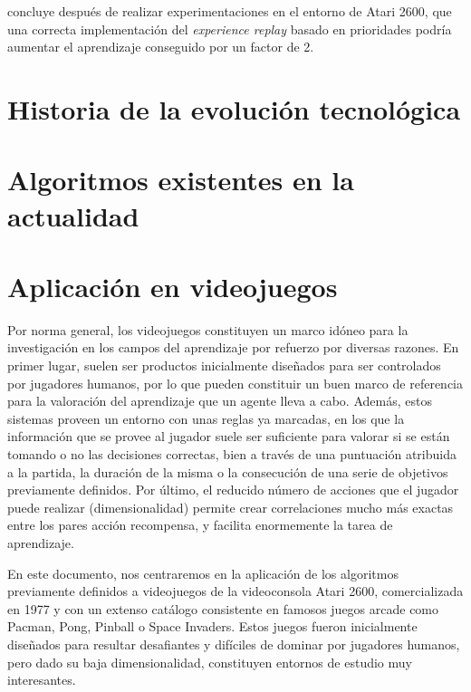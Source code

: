 \documentclass[11pt,spanish,listoffigures,listoftables]{tfgetsinf}
\begin{document}
\cite{exp_replay_prior} concluye después de realizar experimentaciones en el entorno de Atari 2600, que una correcta implementación del \textit{experience replay} basado en prioridades podría aumentar el aprendizaje conseguido por un factor de 2.



\section{Historia de la evolución tecnológica}

\section{Algoritmos existentes en la actualidad}

\section{Aplicación en videojuegos}

Por norma general, los videojuegos constituyen un marco idóneo para la investigación en los campos del aprendizaje por refuerzo por diversas razones. En primer lugar, suelen ser productos inicialmente diseñados para ser controlados por jugadores humanos, por lo que pueden constituir un buen marco de referencia para la valoración del aprendizaje que un agente lleva a cabo. Además, estos sistemas proveen un entorno con unas reglas ya marcadas, en los que la información que se provee al jugador suele ser suficiente para valorar si se están tomando o no las decisiones correctas, bien a través de una puntuación atribuida a la partida, la duración de la misma o la consecución de una serie de objetivos previamente definidos. Por último, el reducido número de acciones que el jugador puede realizar (dimensionalidad) permite crear correlaciones mucho más exactas entre los pares acción recompensa, y facilita enormemente la tarea de aprendizaje.

En este documento, nos centraremos en la aplicación de los algoritmos previamente definidos a videojuegos de la videoconsola Atari 2600, comercializada en 1977 y con un extenso catálogo consistente en famosos juegos arcade como Pacman, Pong, Pinball o Space Invaders. Estos juegos fueron inicialmente diseñados para resultar desafiantes y difíciles de dominar por jugadores humanos, pero dado su baja dimensionalidad, constituyen entornos de estudio muy interesantes. 
\end{document}
